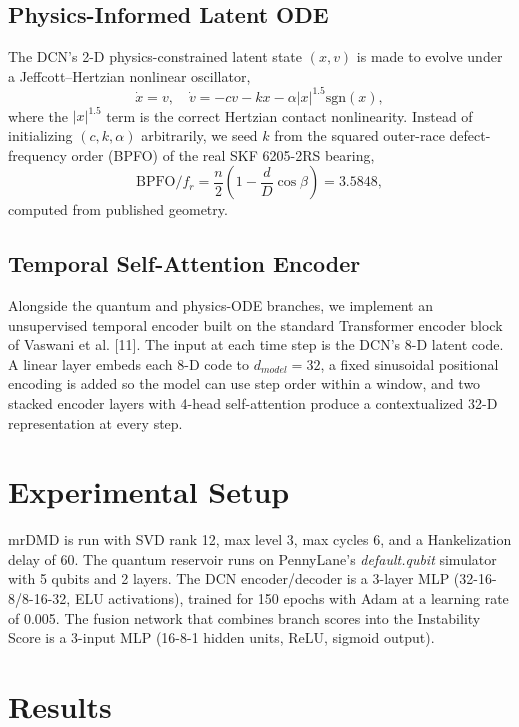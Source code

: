 \documentclass[3p,times,procedia]{elsarticle}
\begin{document}
\subsection{Physics-Informed Latent ODE}
The DCN's 2-D physics-constrained latent state $(x, v)$ is made to evolve under a Jeffcott--Hertzian nonlinear oscillator,
\begin{equation}
\dot{x} = v, \quad \dot{v} = -cv - kx - \alpha|x|^{1.5}\text{sgn}(x),
\end{equation}
where the $|x|^{1.5}$ term is the correct Hertzian contact nonlinearity. Instead of initializing $(c, k, \alpha)$ arbitrarily, we seed $k$ from the squared outer-race defect-frequency order (BPFO) of the real SKF 6205-2RS bearing,
\begin{equation}
\text{BPFO}/f_r = \frac{n}{2} \left( 1 - \frac{d}{D}\cos\beta \right) = 3.5848,
\end{equation}
computed from published geometry.

\subsection{Temporal Self-Attention Encoder}
Alongside the quantum and physics-ODE branches, we implement an unsupervised temporal encoder built on the standard Transformer encoder block of Vaswani et al. [11]. The input at each time step is the DCN's 8-D latent code. A linear layer embeds each 8-D code to $d_{model} = 32$, a fixed sinusoidal positional encoding is added so the model can use step order within a window, and two stacked encoder layers with 4-head self-attention produce a contextualized 32-D representation at every step.

\section{Experimental Setup}
mrDMD is run with SVD rank 12, max level 3, max cycles 6, and a Hankelization delay of 60. The quantum reservoir runs on PennyLane's \textit{default.qubit} simulator with 5 qubits and 2 layers. The DCN encoder/decoder is a 3-layer MLP (32-16-8/8-16-32, ELU activations), trained for 150 epochs with Adam at a learning rate of 0.005. The fusion network that combines branch scores into the Instability Score is a 3-input MLP (16-8-1 hidden units, ReLU, sigmoid output).

\section{Results}
\end{document}
